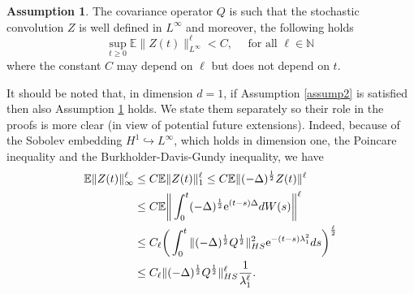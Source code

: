 \documentclass[reqno, 11pt]{amsart}
\theoremstyle{plain}
\theoremstyle{definition}
\newtheorem{assumption}[theorem]{Assumption}
\theoremstyle{remark}
\numberwithin{equation}{section}
\numberwithin{theorem}{section}
\begin{document}
{\begin{assumption}\label{assumption: on the covariance operator Q} The covariance operator $Q$ is such that the stochastic convolution $Z$ is well defined in $L^{\infty}$ and moreover, the following holds
$$
\sup_{t\geq 0} \mathbb E \|Z(t)\|^\ell_{L^{\infty}} < C, \quad \mbox{ for all } \ell \in \mathbb N \, 
$$
where the constant $C$ may depend on $\ell$ but does not depend on $t$. 
\end{assumption}
It should be noted that, in dimension $d=1$, if Assumption \ref{assump2} is satisfied then also Assumption \ref{assumption: on the covariance operator Q} holds. We state them separately so their role in the proofs is more clear (in view of potential future extensions).  Indeed, because of the Sobolev embedding $H^1\hookrightarrow L^\infty$,  which holds in dimension one, the Poincare inequality and the Burkholder-Davis-Gundy inequality, we have 
\begin{align}
\mathbb E \|Z(t)\|_\infty^{\ell} &\leq C\mathbb E\|Z(t)\|_1^{\ell}\leq C\mathbb E\|(-\Delta)^{\frac{1}{2}}Z(t)\|^{\ell} \notag\\
&\leq C\mathbb E \bigg\|\int_0^t (-\Delta)^{\frac{1}{2}}\mathrm{e}^{(t-s)\Delta}dW(s)\bigg\|^{\ell}\notag\\
&\leq C_{\ell} \bigg(\int_0^t \|(-\Delta)^{\frac{1}{2}}Q^{\frac{1}{2}}\|_{HS}^2 \mathrm{e}^{-(t-s)\lambda_1^2}ds\bigg)^{\frac{\ell}{2}}\notag\\
&\leq C_{\ell}  \|(-\Delta)^{\frac{1}{2}}Q^{\frac{1}{2}}\|_{HS}^{\ell} \frac{1}{\lambda_1^{\ell}}.
\end{align}
 

}
\end{document}

